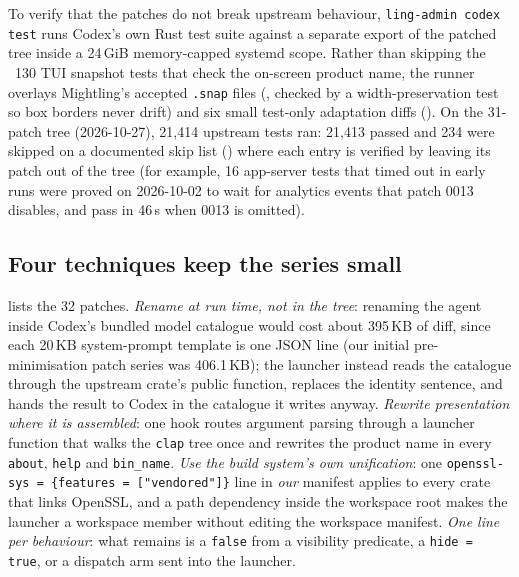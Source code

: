 \documentclass[11pt]{article}
\newcommand{\code}[1]{\texttt{#1}}
\begin{document}
To verify that the patches do not break upstream behaviour, \code{ling-admin codex test} runs
Codex's own Rust test suite against a separate export of the patched tree inside a 24\,GiB
memory-capped systemd scope. Rather than skipping the ~130 TUI snapshot tests that check the
on-screen product name, the runner overlays Mightling's accepted \code{.snap} files
(, checked by a width-preservation test so box borders never drift)
and six small test-only adaptation diffs (). On the 31-patch tree
(2026-10-27), 21{,}414 upstream tests ran: 21{,}413 passed and 234 were skipped on a documented
skip list () where each entry is verified by leaving its
patch out of the tree (for example, 16 app-server tests that timed out in early runs were proved on
2026-10-02 to wait for analytics events that patch 0013 disables, and pass in 46\,s when 0013 is
omitted).

\subsection{Four techniques keep the series small}

 lists the 32 patches. \emph{Rename at run time, not in the tree}: renaming the
agent inside Codex's bundled model catalogue would cost about 395\,KB of diff, since each 20\,KB
system-prompt template is one JSON line (our initial pre-minimisation patch series was 406.1\,KB);
the launcher instead reads the catalogue through the upstream crate's public function, replaces the
identity sentence, and hands the result to Codex in the catalogue it writes anyway. \emph{Rewrite
presentation where it is assembled}: one hook routes argument parsing through a launcher function
that walks the \code{clap} tree once and rewrites the product name in every \code{about},
\code{help} and \code{bin\_name}. \emph{Use the build system's own unification}: one
\code{openssl-sys = \{features = ["vendored"]\}} line in \emph{our} manifest applies to every crate
that links OpenSSL, and a path dependency inside the workspace root makes the launcher a workspace
member without editing the workspace manifest. \emph{One line per behaviour}: what remains is a
\code{false} from a visibility predicate, a \code{hide = true}, or a dispatch arm sent into the
launcher.
\end{document}
